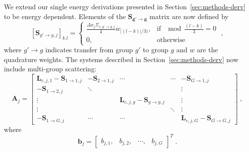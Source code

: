 We extend our single energy derivations presented in Section~\ref{sec:methods-derv} to be energy dependent. 
Elements of the $\mathbf{S_{g' \rightarrow g}}$ matrix are now defined by
\begin{equation}
    \label{eq:scatter}
   [\mathbf{S}_{g' \rightarrow g,j}]_{k.l} = \begin{cases}
			\frac{\Delta x_j \Sigma_{s,g'\rightarrow g,j}}{4}w_{|(l-k)|/3)}, & \text{if $\mod{\frac{(l-k)}{3} =0}$}\\
            0, & \text{otherwise}
		 \end{cases} \; ,
\end{equation}
where $g' \rightarrow g$ indicates transfer from group $g'$ to group $g$ and $w$ are the quadrature weights. 
The systems described in Section~\ref{sec:methods-derv} now include multi-group scattering:
\begin{equation}
    \bm{A}_j = 
    \begin{bmatrix}
        \bm{L}_{c,j,1} -\bm{S}_{1\rightarrow1,j} & -\bm{S}_{2\rightarrow1,j} & \cdots & \cdots& -\bm{S}_{G\rightarrow1,j}\\
        -\bm{S}_{1\rightarrow2,j} & \ddots & & & \vdots\\
         \vdots & & \bm{L}_{c,j,g}-\bm{S}_{g\rightarrow g,j} &  & \vdots\\
        \vdots & &  &  \ddots & \vdots \\
        -\bm{S}_{1\rightarrow G,j} & \cdots & \cdots & & \bm{L}_{c,j,G} -\bm{S}_{G\rightarrow G,j}
    \end{bmatrix} \; ,
\end{equation}
where
\begin{equation}
    \bm{b}_j = 
    \begin{bmatrix}
        b_{j,1}, & b_{j,2}, & \cdots, & b_{j,G}
    \end{bmatrix} ^T \; .
\end{equation}

